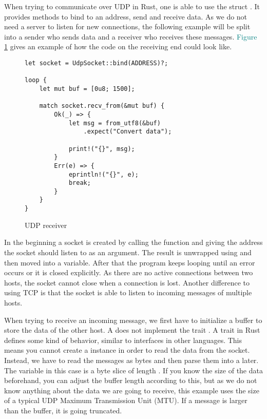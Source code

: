 When trying to communicate over UDP in Rust, one is able to use the struct . It provides
methods to bind to an address, send and receive data. As we do not need a server to listen for new connections, the
following example will be split into a sender who sends data and a receiver who receives these messages.
\textcolor{teal}{Figure \ref{udp-receiver}} gives an example of how the code on the receiving end could look like.

\begin{figure}[ht]
    \begin{verbatim}
let socket = UdpSocket::bind(ADDRESS)?;

loop {
    let mut buf = [0u8; 1500];

    match socket.recv_from(&mut buf) {
        Ok(_) => {
            let msg = from_utf8(&buf)
                .expect("Convert data");

            print!("{}", msg);
        }
        Err(e) => {
            eprintln!("{}", e);
            break;
        }
    }
}
    \end{verbatim}
    \caption{UDP receiver}
    \label{udp-receiver}
\end{figure}

In the beginning a socket is created by calling the  function and giving the address the socket should listen
to as an argument. The result is unwrapped using  and then moved into a variable. After that the program keeps
looping until an error occurs or it is closed explicitly. As there are no active connections between two hosts, the
socket cannot close when a connection is lost. Another difference to using TCP is that the socket is able to listen to
incoming messages of multiple hosts.

When trying to receive an incoming message, we first have to initialize a buffer to store the data of the other host.
A  does not implement the trait . A trait in Rust defines some kind of behavior,
similar to interfaces in other languages. This means you cannot create a  instance in order to read the
data from the socket. Instead, we have to read the messages as bytes and then parse them into a  later.
The variable  in this case is a byte slice of length . If you know the size of the data
beforehand, you can adjust the buffer length according to this, but as we do not know anything about the data we are
going to receive, this example uses the size of a typical UDP Maximum Transmission Unit (MTU). If a message is larger
than the buffer, it is going truncated.

